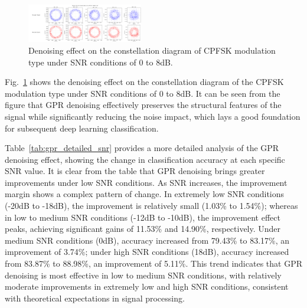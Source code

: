 \documentclass[conference]{IEEEtran}
\begin{document}
\begin{figure}[htbp]
\centering
\includegraphics[width=0.45\textwidth]{figure/constellation_denoising.png}
\caption{Denoising effect on the constellation diagram of CPFSK modulation type under SNR conditions of 0 to 8dB.}
\label{fig:constellation_denoising}
\end{figure}

Fig.~\ref{fig:constellation_denoising} shows the denoising effect on the constellation diagram of the CPFSK modulation type under SNR conditions of 0 to 8dB. It can be seen from the figure that GPR denoising effectively preserves the structural features of the signal while significantly reducing the noise impact, which lays a good foundation for subsequent deep learning classification.

Table~\ref{tab:gpr_detailed_snr} provides a more detailed analysis of the GPR denoising effect, showing the change in classification accuracy at each specific SNR value. It is clear from the table that GPR denoising brings greater improvements under low SNR conditions. As SNR increases, the improvement margin shows a complex pattern of change. In extremely low SNR conditions (-20dB to -18dB), the improvement is relatively small (1.03\% to 1.54\%); whereas in low to medium SNR conditions (-12dB to -10dB), the improvement effect peaks, achieving significant gains of 11.53\% and 14.90\%, respectively. Under medium SNR conditions (0dB), accuracy increased from 79.43\% to 83.17\%, an improvement of 3.74\%; under high SNR conditions (18dB), accuracy increased from 83.87\% to 88.98\%, an improvement of 5.11\%. This trend indicates that GPR denoising is most effective in low to medium SNR conditions, with relatively moderate improvements in extremely low and high SNR conditions, consistent with theoretical expectations in signal processing.
\end{document}
